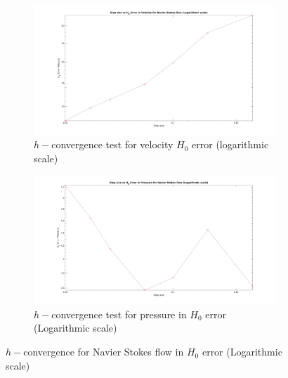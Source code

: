\documentclass[a4paper,openany]{book}
\begin{document}
\begin{figure}
\begin{subfigure}{\textwidth}	
  \includegraphics[width=\linewidth]{H0_convergence_velocity_n_s_log.jpg}
  \caption{$h-$convergence test for velocity $H_0$ error (logarithmic scale)}
  \label{fig:vel_navier_stoke_conv_log_h0}
\end{subfigure}
\begin{subfigure}{\textwidth}	
  \includegraphics[width=\linewidth]{H0_convergence_pressure_n_s_log.jpg}
  \caption{$h-$convergence test for pressure in $H_0$ error (Logarithmic scale)}
  \label{fig:pre_navier_stoke_conv_log_h0}
\end{subfigure}
\caption{$h-$convergence for Navier Stokes flow in $H_0$ error (Logarithmic scale)}
\label{navier_stoke_conv_h0_log}
\end{figure}
\end{document}
